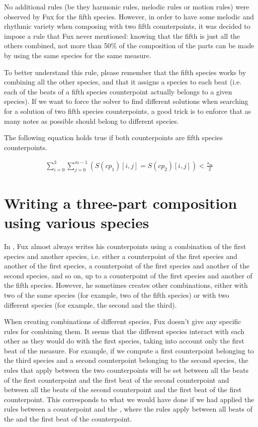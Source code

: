 No additional rules (be they harmonic rules, melodic rules or motion rules) were observed by Fux for the fifth species.
However, in order to have some melodic and rhythmic variety when composing with two fifth counterpoints, it was decided to impose a rule that Fux never mentioned: knowing that the fifth is just all the others combined, not more than 50\% of the composition of the parts can be made by using the same species for the same measure.


To better understand this rule, please remember that the fifth species works by combining all the other species, and that it assigns a species to each beat (i.e. each of the beats of a fifth species counterpoint actually belongs to a given species). If we want to force the solver to find different solutions when searching for a solution of two fifth species counterpoints, a good trick is to enforce that as many notes as possible should belong to different species.

The following equation holds true if both counterpoints are fifth species counterpoints.


\begin{equation}
\begin{aligned}
\sum_{i=0}^{3} \sum_{j=0}^{m-1} (S(cp_1)[i,j] = S(cp_2)[i,j]) < \frac{s_m}{2}
\end{aligned}
\end{equation}

\section{Writing a three-part composition using various species}
In \gap, Fux almost always writes his counterpoints using a combination of the first species and another species, i.e. either a counterpoint of the first species and another of the first species, a counterpoint of the first species and another of the second species, and so on, up to a counterpoint of the first species and another of the fifth species. However, he sometimes creates other combinations, either with two of the same species (for example, two of the fifth species) or with two different species (for example, the second and the third).

When creating combinations of different species, Fux doesn't give any specific rules for combining them. It seems that the different species interact with each other as they would do with the first species, taking into account only the first beat of the measure. For example, if we compute a first counterpoint belonging to the third species and a second counterpoint belonging to the second species, the rules that apply between the two counterpoints will be set between all the beats of the first counterpoint and the first beat of the second counterpoint and between all the beats of the second counterpoint and the first beat of the first counterpoint. This corresponds to what we would have done if we had applied the rules between a counterpoint and the \cf, where the rules apply between all beats of the \cf and the first beat of the counterpoint.
